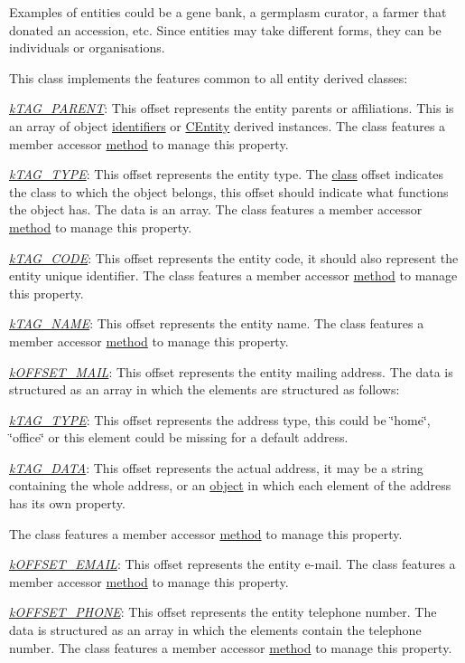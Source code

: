 Examples of entities could be a gene bank, a germplasm curator, a farmer that donated an accession, etc. Since entities may take different forms, they can be individuals or organisations.

This class implements the features common to all entity derived classes\-:


\begin{DoxyItemize}
\item {\itshape \hyperlink{}{k\-T\-A\-G\-\_\-\-P\-A\-R\-E\-N\-T}\/}\-: This offset represents the entity parents or affiliations. This is an array of object \hyperlink{}{identifiers} or \hyperlink{class_c_entity}{C\-Entity} derived instances. The class features a member accessor \hyperlink{}{method} to manage this property. 
\item {\itshape \hyperlink{}{k\-T\-A\-G\-\_\-\-T\-Y\-P\-E}\/}\-: This offset represents the entity type. The \hyperlink{}{class} offset indicates the class to which the object belongs, this offset should indicate what functions the object has. The data is an array. The class features a member accessor \hyperlink{}{method} to manage this property. 
\item {\itshape \hyperlink{}{k\-T\-A\-G\-\_\-\-C\-O\-D\-E}\/}\-: This offset represents the entity code, it should also represent the entity unique identifier. The class features a member accessor \hyperlink{}{method} to manage this property. 
\item {\itshape \hyperlink{}{k\-T\-A\-G\-\_\-\-N\-A\-M\-E}\/}\-: This offset represents the entity name. The class features a member accessor \hyperlink{}{method} to manage this property. 
\item {\itshape \hyperlink{}{k\-O\-F\-F\-S\-E\-T\-\_\-\-M\-A\-I\-L}\/}\-: This offset represents the entity mailing address. The data is structured as an array in which the elements are structured as follows\-: 
\begin{DoxyItemize}
\item {\itshape \hyperlink{}{k\-T\-A\-G\-\_\-\-T\-Y\-P\-E}\/}\-: This offset represents the address type, this could be \char`\"{}home\char`\"{}, \char`\"{}office\char`\"{} or this element could be missing for a default address. 
\item {\itshape \hyperlink{}{k\-T\-A\-G\-\_\-\-D\-A\-T\-A}\/}\-: This offset represents the actual address, it may be a string containing the whole address, or an \hyperlink{}{object} in which each element of the address has its own property. 
\end{DoxyItemize}The class features a member accessor \hyperlink{}{method} to manage this property. 
\item {\itshape \hyperlink{}{k\-O\-F\-F\-S\-E\-T\-\_\-\-E\-M\-A\-I\-L}\/}\-: This offset represents the entity e-\/mail. The class features a member accessor \hyperlink{}{method} to manage this property. 
\item {\itshape \hyperlink{}{k\-O\-F\-F\-S\-E\-T\-\_\-\-P\-H\-O\-N\-E}\/}\-: This offset represents the entity telephone number. The data is structured as an array in which the elements contain the telephone number. The class features a member accessor \hyperlink{}{method} to manage this property. 
\end{DoxyItemize}

